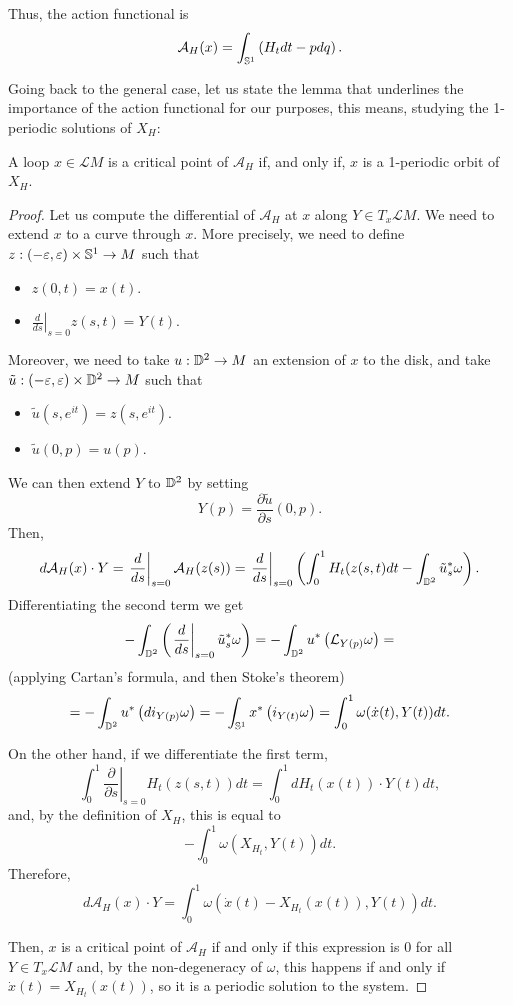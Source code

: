 Thus, the action functional is
\[\mathcal{A}_H (x) = \int_{\mathbb{S}^1} \left( H_t d t - p d q \right) .\]

Going back to the general case, let us state the lemma that underlines the importance of the action functional for our purposes, this means, studying the 1-periodic solutions of $X_H$:

\begin{prop}
A loop $x \in \mathcal{L}M$ is a critical point of $\mathcal{A}_H$ if, and only if, $x$ is a 1-periodic orbit of $X_H$.
\end{prop}

\begin{proof}
Let us compute the differential of $\mathcal{A}_H$ at $x$ along $Y \in T_x\mathcal{L}M$. We need to extend $x$ to a curve through $x$. More precisely, we need to define $z : (-\varepsilon,\varepsilon) \times \mathbb{S}^1 \rightarrow M$ such that

\begin{itemize}
	\item $z(0,t) = x(t)$.
	\item $\left. \frac{d}{d s} \right|_{s=0} z(s,t) = Y(t)$.
\end{itemize}

Moreover, we need to take $u : \mathbb{D}^2 \rightarrow M$ an extension of $x$ to the disk, and take $\tilde{u} : (-\varepsilon,\varepsilon) \times \mathbb{D}^2 \rightarrow M$ such that

\begin{itemize}
	\item $\tilde{u}(s,e^{it}) = z(s,e^{it})$.
	\item $\tilde{u}(0,p) = u(p)$.
\end{itemize}

We can then extend $Y$ to $\mathbb{D}^2$ by setting
\[Y(p) = \frac{\partial \tilde{u}}{\partial s} (0,p) .\]
Then,
\[d \mathcal{A}_H(x) \cdot Y = \left. \frac{d}{d s} \right|_{s=0} \mathcal{A}_H(z(s)) = \left. \frac{d}{d s} \right|_{s=0} \left( \int_0^1 H_t(z(s,t) d t - \int_{\mathbb{D}^2} \tilde{u}_s^{\ast} \omega \right) .\]
Differentiating the second term we get
\[- \int_{\mathbb{D}^2} \left( \left. \frac{d}{d s} \right|_{s=0} \tilde{u}_s^{\ast} \omega \right) = - \int_{\mathbb{D}^2} u^{\ast} \left( \mathcal{L}_{Y(p)} \omega \right) =\]
(applying Cartan's formula, and then Stoke's theorem)
\[= - \int_{\mathbb{D}^2} u^{\ast} \left( d i_{Y(p)} \omega \right) = - \int_{\mathbb{S}^1} x^{\ast} \left( i_{Y(t)} \omega \right) = \int_0^1 \omega(\dot{x}(t),Y(t)) d t .\]

On the other hand, if we differentiate the first term,
\[\int_0^1 \left. \frac{\partial}{\partial s} \right|_{s=0} H_t(z(s,t)) d t = \int_0^1 d H_t(x(t)) \cdot Y(t) d t ,\]
and, by the definition of $X_H$, this is equal to
\[- \int_0^1 \omega(X_{H_t},Y(t)) d t .\]
Therefore,
\[d \mathcal{A}_H(x) \cdot Y = \int_0^1 \omega(\dot{x}(t) - X_{H_t}(x(t)), Y(t)) d t .\]

Then, $x$ is a critical point of $\mathcal{A}_H$ if and only if this expression is $0$ for all $Y \in T_x\mathcal{L}M$ and, by the non-degeneracy of $\omega$, this happens if and only if $\dot{x}(t) = X_{H_t}(x(t))$, so it is a periodic solution to the system.
\end{proof}
